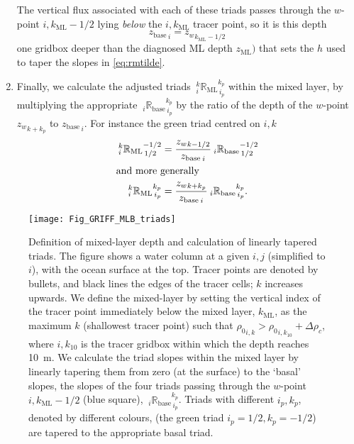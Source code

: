 \documentclass[../main/NEMO_manual]{subfiles}
\begin{document}
\begin{enumerate}
The vertical flux associated with each of these triads passes through
the $w$-point $i,k_{\mathrm{ML}}-1/2$ lying \emph{below} the $i,k_{\mathrm{ML}}$ tracer point, so it is this depth
\[
  {z_\mathrm{base}}_{\,i}={z_{w}}_{k_\mathrm{ML}-1/2}
\]
one gridbox deeper than the diagnosed ML depth $z_{\mathrm{ML}})$ that sets the $h$ used to taper the slopes in
\autoref{eq:rmtilde}.
\item
  Finally, we calculate the adjusted triads ${\:}_i^k{\mathbb{R}_{\mathrm{ML}}}_{\,i_p}^{k_p}$ within
  the mixed layer, by multiplying the appropriate ${\:}_i{\mathbb{R}_{\mathrm{base}}}_{\,i_p}^{k_p}$ by
  the ratio of the depth of the $w$-point ${z_w}_{k+k_p}$ to ${z_{\mathrm{base}}}_{\,i}$.
  For instance the green triad centred on $i,k$
  \begin{align*}
    {\:}_i^k{\mathbb{R}_{\mathrm{ML}}}_{\,1/2}^{-1/2} &=
                                                        \frac{{z_w}_{k-1/2}}{{z_{\mathrm{base}}}_{\,i}}{\:}_i{\mathbb{R}_{\mathrm{base}}}_{\,1/2}^{-1/2} \\
    \intertext{and more generally}
    {\:}_i^k{\mathbb{R}_{\mathrm{ML}}}_{\,i_p}^{k_p} &=
                                                       \frac{{z_w}_{k+k_p}}{{z_{\mathrm{base}}}_{\,i}}{\:}_i{\mathbb{R}_{\mathrm{base}}}_{\,i_p}^{k_p}.
  \end{align*}
\end{enumerate}

\begin{figure}[h]
  \caption{
    \protect\label{fig:MLB_triad}
    Definition of mixed-layer depth and calculation of linearly tapered triads.
    The figure shows a water column at a given $i,j$ (simplified to $i$), with the ocean surface at the top.
    Tracer points are denoted by bullets, and black lines the edges of the tracer cells;
    $k$ increases upwards.
    \newline
    \hspace{5 em}
    We define the mixed-layer by setting the vertical index of the tracer point immediately below the mixed layer,
    $k_{\mathrm{ML}}$, as the maximum $k$ (shallowest tracer point) such that
    ${\rho_0}_{i,k}>{\rho_0}_{i,k_{10}}+\Delta\rho_c$,
    where $i,k_{10}$ is the tracer gridbox within which the depth reaches 10~m.
    We calculate the triad slopes within the mixed layer by linearly tapering them from zero
    (at the surface) to the `basal' slopes,
    the slopes of the four triads passing through the $w$-point $i,k_{\mathrm{ML}}-1/2$ (blue square),
    ${\:}_i{\mathbb{R}_{\mathrm{base}}}_{\,i_p}^{k_p}$.
    Triads with different $i_p,k_p$, denoted by different colours,
    (\eg the green triad $i_p=1/2,k_p=-1/2$) are tapered to the appropriate basal triad.}
  \texttt{[image: Fig\_GRIFF\_MLB\_triads]}
\end{figure}
\end{document}
